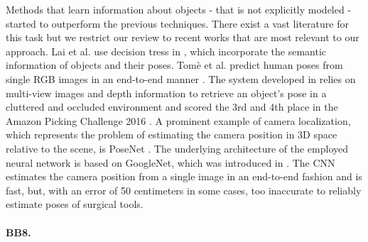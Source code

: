 Methods that learn information about objects - that is not explicitly modeled - started to outperform the previous techniques. There exist a vast literature for this task but we restrict our review to recent works that are most relevant to our approach.
\nnewline
Lai et al. use decision tress in \cite{klai}, which incorporate the semantic information of objects and their poses. Tom{\`{e}} et al. predict human poses from single RGB images in an end-to-end manner \cite{dtome}. The system developed in \cite{azeng} relies on multi-view images and depth information to retrieve an object's pose in a cluttered and occluded environment and scored the 3rd and 4th place in the Amazon Picking Challenge 2016 \cite{apc}. A prominent example of camera localization, which represents the problem of estimating the camera position in 3D space relative to the scene, is PoseNet \cite{posenet}. The underlying architecture of the employed neural network is based on GoogleNet, which was introduced in \cite{googlenet}. The CNN estimates the camera position from a single image in an end-to-end fashion and is fast, but, with an error of 50 centimeters in some cases, too inaccurate to reliably estimate poses of surgical tools.

\paragraph{BB8.}

